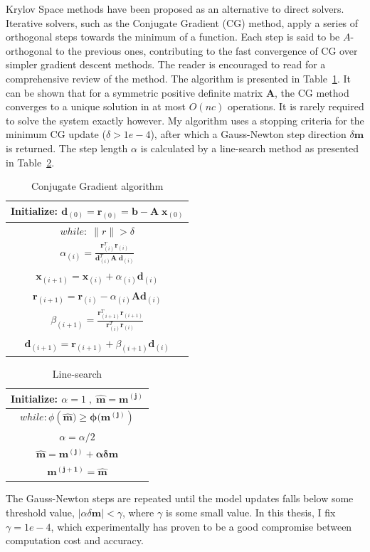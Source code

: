 Krylov Space methods have been proposed as an alternative to direct solvers.
Iterative solvers, such as the Conjugate Gradient (CG) method, apply a series of orthogonal steps towards the minimum of a function.
Each step is said to be $A$-orthogonal to the previous ones, contributing to the fast convergence of CG over simpler gradient descent methods. 
The reader is encouraged to read \cite{Shewchuk1994} for a comprehensive review of the method.
The algorithm is presented in Table~\ref{CG}.
It can be shown that for a symmetric positive definite matrix $\mathbf{A}$, the CG method converges to a unique solution in at most $O(nc)$ operations.
It is rarely required to solve the system exactly however.
My algorithm uses a stopping criteria for the minimum CG update  ($\delta > 1e-4$), after which a Gauss-Newton step direction $\delta \mathbf{m}$ is returned.  
The step length $\alpha$ is calculated by a line-search method as presented in Table~\ref{tbl:Line-search}.
\begin{table}[h!]
\centering
\caption{Conjugate Gradient algorithm}
\label{CG}
\renewcommand{\arraystretch}{1.2}
\begin{tabular}{|c|}\hline
\textbf{Initialize}: $\mathbf{d}_{(0)} = \mathbf{r}_{(0)} = \mathbf{b} - \mathbf{A\;x}_{(0)}$ \\ \hline
$while: \; \|r\| > \delta$ \\ 
$\alpha_{(i)} = \frac{\mathbf{r}_{(i)}^T \mathbf{r}_{(i)}}{\mathbf{d}_{(i)}^T\mathbf{A\;d}_{(i)}}$ \\
$\mathbf{x}_{(i+1)} = \mathbf{x}_{(i)} + \alpha_{(i)} \mathbf{d}_{(i)}$ \\
$\mathbf{r}_{(i+1)} = \mathbf{r}_{(i)} - \alpha_{(i)} \mathbf{Ad}_{(i)}$ \\
$\beta_{(i+1)} = \frac{\mathbf{r}_{(i+1)}^T \mathbf{r}_{(i+1)}}{\mathbf{r}_{(i)}^T\mathbf{r}_{(i)}}$ \\
$\mathbf{d}_{(i+1)} = \mathbf{r}_{(i+1)} + \beta_{(i+1)} \mathbf{d}_{(i)}$ \\ \hline
\end{tabular}
\end{table}
\begin{table}[h!]
\centering
\caption{Line-search}
\label{tbl:Line-search}
\renewcommand{\arraystretch}{1.2}
\begin{tabular}{|c|}\hline
\textbf{Initialize}:   $\alpha = 1\;,\;\mathbf{\hat m = m^{(j)}}$\\ \hline
$while : \phi(\mathbf{\hat m) \ge \phi(m^{(j)}})$ 	\\
	 $\alpha = \alpha / 2 $\\
	 $ \mathbf{\hat m = m^{(j)} + \alpha \delta m}$\\  \hline
 $\mathbf{m^{(j+1)} = \hat m }$\\ \hline
\end{tabular}
\end{table}
The Gauss-Newton steps are repeated until the model updates falls below some threshold value, $|\alpha \delta \mathbf{m}| < \gamma$,
where $\gamma$ is some small value. In this thesis, I fix $\gamma=1e-4$, which experimentally has proven to be a good compromise between computation cost and accuracy.

